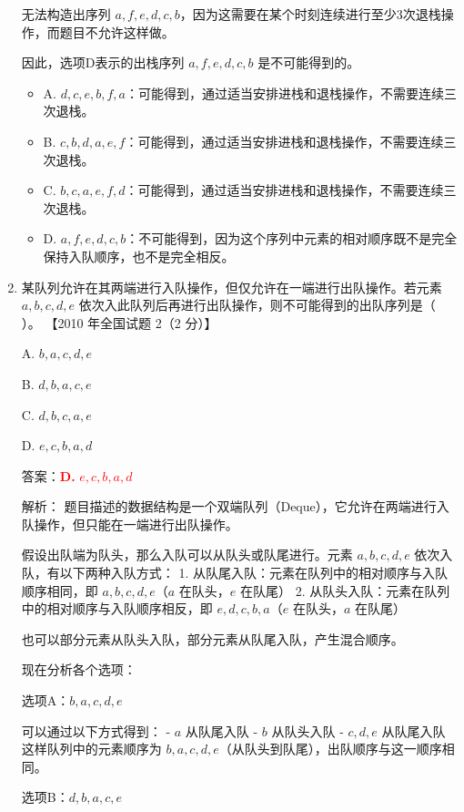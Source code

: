 \documentclass[lang=cn,newtx,10pt,scheme=chinese]{../../../elegantbook}
\begin{document}
\begin{enumerate}
    无法构造出序列 $a, f, e, d, c, b$，因为这需要在某个时刻连续进行至少3次退栈操作，而题目不允许这样做。

    因此，选项D表示的出栈序列 $a, f, e, d, c, b$ 是不可能得到的。

    \begin{itemize}
        \item A. $d, c, e, b, f, a$：可能得到，通过适当安排进栈和退栈操作，不需要连续三次退栈。
        \item B. $c, b, d, a, e, f$：可能得到，通过适当安排进栈和退栈操作，不需要连续三次退栈。
        \item C. $b, c, a, e, f, d$：可能得到，通过适当安排进栈和退栈操作，不需要连续三次退栈。
        \item D. $a, f, e, d, c, b$：不可能得到，因为这个序列中元素的相对顺序既不是完全保持入队顺序，也不是完全相反。
    \end{itemize}

    \item 某队列允许在其两端进行入队操作，但仅允许在一端进行出队操作。若元素 $a, b, c, d, e$ 依次入此队列后再进行出队操作，则不可能得到的出队序列是（ ）。  
    【2010 年全国试题 2（2 分）】  

    A. $b, a, c, d, e$  

    B. $d, b, a, c, e$  

    C. $d,b,c,a,e$  

    D. $e, c, b, a, d$  

    答案：\textcolor{red}{\textbf{D.} $e, c, b, a, d$}

    解析：
    题目描述的数据结构是一个双端队列（Deque），它允许在两端进行入队操作，但只能在一端进行出队操作。

    假设出队端为队头，那么入队可以从队头或队尾进行。元素 $a, b, c, d, e$ 依次入队，有以下两种入队方式：
    1. 从队尾入队：元素在队列中的相对顺序与入队顺序相同，即 $a, b, c, d, e$（$a$ 在队头，$e$ 在队尾）
    2. 从队头入队：元素在队列中的相对顺序与入队顺序相反，即 $e, d, c, b, a$（$e$ 在队头，$a$ 在队尾）

    也可以部分元素从队头入队，部分元素从队尾入队，产生混合顺序。

    现在分析各个选项：

    选项A：$b, a, c, d, e$
    
    可以通过以下方式得到：
    - $a$ 从队尾入队
    - $b$ 从队头入队
    - $c, d, e$ 从队尾入队
    这样队列中的元素顺序为 $b, a, c, d, e$（从队头到队尾），出队顺序与这一顺序相同。
    
    选项B：$d, b, a, c, e$
    

\end{enumerate}
\end{document}
